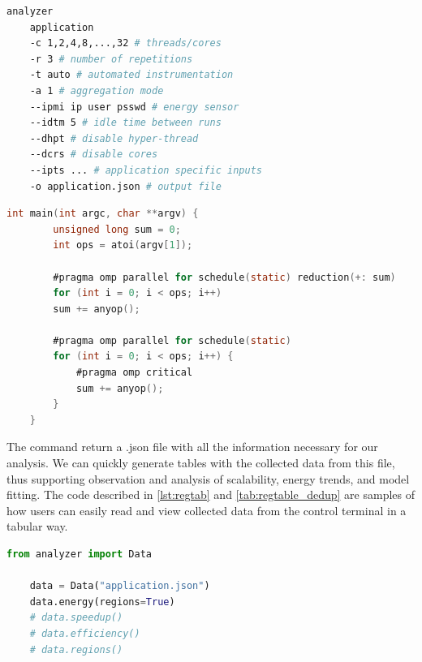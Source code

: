 \lstset{style=ccodestyle, frame=tb}
\begin{lstlisting}[label={lst:pascal_usage_ex}, language=bash, caption={Command line showing how experiments were run through a terminal.}]
	analyzer 
	application
	-c 1,2,4,8,...,32 # threads/cores
	-r 3 # number of repetitions
	-t auto # automated instrumentation
	-a 1 # aggregation mode
	--ipmi ip user psswd # energy sensor
	--idtm 5 # idle time between runs
	--dhpt # disable hyper-thread
	--dcrs # disable cores
	--ipts ... # application specific inputs
	-o application.json # output file
\end{lstlisting}

\lstset{style=ccodestyle, frame=tb}
\begin{lstlisting}[label={lst:codes_regionscomparison}, language=C, caption={Sample code used to visualize the impact of regions on program scalability.}]
	int main(int argc, char **argv) {
		unsigned long sum = 0;
		int ops = atoi(argv[1]);
		
		#pragma omp parallel for schedule(static) reduction(+: sum)
		for (int i = 0; i < ops; i++)
		sum += anyop();
		
		#pragma omp parallel for schedule(static)
		for (int i = 0; i < ops; i++) {
			#pragma omp critical
			sum += anyop();
		}
	}
\end{lstlisting}

The command return a .json file with all the information necessary for our analysis. We can quickly generate tables with the collected data from this file, thus supporting observation and analysis of scalability, energy trends, and model fitting. The code described in \cref{lst:regtab} and \cref{tab:regtable_dedup} are samples of how users can easily read and view collected data from the control terminal in a tabular way.

\lstset{style=pythonStyle, frame=tb}
\begin{lstlisting}[label={lst:regtab}, language=python, captionpos=b, caption={Example of using the Python API to load analyzer files.}]
	from analyzer import Data
	
	data = Data("application.json")
	data.energy(regions=True)
	# data.speedup()
	# data.efficiency()
	# data.regions()
\end{lstlisting}

